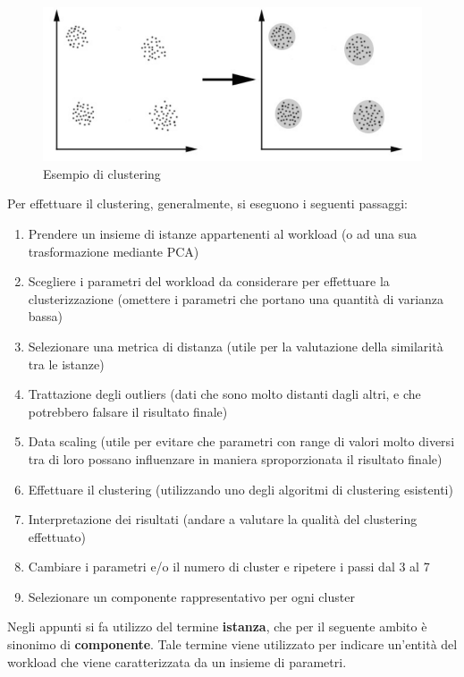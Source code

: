 \begin{figure}[h]
\centering
\includegraphics[width=.6\textwidth]{img/chapter-3/Clustering.png}
\caption{Esempio di clustering}\label{img:clustering}
\end{figure}

Per effettuare il clustering, generalmente, si eseguono i seguenti passaggi:
\begin{enumerate}
    \item Prendere un insieme di istanze appartenenti al workload (o ad una sua trasformazione mediante PCA)
    \item Scegliere i parametri del workload da considerare per effettuare la clusterizzazione (omettere i parametri che portano una quantità di varianza bassa)
    \item Selezionare una metrica di distanza (utile per la valutazione della similarità tra le istanze)
    \item Trattazione degli outliers (dati che sono molto distanti dagli altri, e che potrebbero falsare il risultato finale)
    \item Data scaling (utile per evitare che parametri con range di valori molto diversi tra di loro possano influenzare in maniera sproporzionata il risultato finale)
    \item Effettuare il clustering (utilizzando uno degli algoritmi di clustering esistenti)
    \item Interpretazione dei risultati (andare a valutare la qualità del clustering effettuato)
    \item Cambiare i parametri e/o il numero di cluster e ripetere i passi dal 3 al 7
    \item Selezionare un componente rappresentativo per ogni cluster
\end{enumerate}

\begin{warn}
Negli appunti si fa utilizzo del termine \textbf{istanza}, che per il seguente ambito è sinonimo di \textbf{componente}. Tale termine viene utilizzato per indicare un'entità del workload che viene caratterizzata da un insieme di parametri.
\end{warn}

